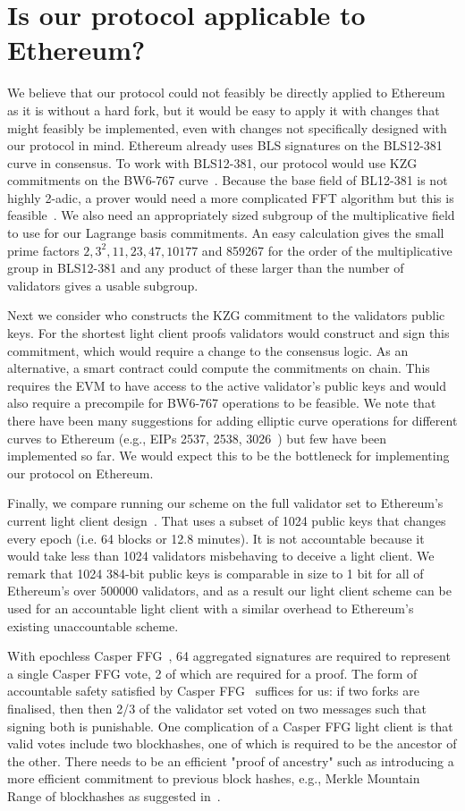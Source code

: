 \section{Is our protocol applicable to Ethereum?}
 \label{sec:ethereum}

We believe that our protocol could not feasibly be directly applied to Ethereum as it is without a hard fork, but it would be easy to apply it with changes that might feasibly be implemented, 
even with changes not specifically designed with our protocol in mind. Ethereum already uses BLS signatures on the BLS12-381 curve in consensus. To work with BLS12-381, 
our protocol would use KZG commitments on the BW6-767 curve~\cite{bw6767}. Because the base field of BL12-381 is not highly 2-adic, a prover would need a more complicated FFT algorithm 
but this is feasible~\cite{bw6767}. We also need an appropriately sized subgroup of the multiplicative field to use for our Lagrange basis commitments. An easy calculation gives the small prime factors $2,3^2,11,23,47,10177$ and 859267 for the order of the multiplicative group in BLS12-381 and any product of these larger than the number of validators gives a usable subgroup.
 
 Next we consider who constructs the KZG commitment to the validators public keys. For the shortest light client proofs validators would construct and sign this commitment, which would require a change to the consensus logic. As an alternative, a smart contract could compute the commitments on chain.
 This requires the EVM to have access to the active validator's public keys and would also require a precompile for BW6-767 operations to be feasible.
 We note that there have been many suggestions for adding elliptic curve operations for different curves to Ethereum (e.g., EIPs 2537, 2538, 3026~\cite{EIPs}) but few have been implemented so far.
 We would expect this to be the bottleneck for implementing our protocol on Ethereum.
 
 Finally, we compare running our scheme on the full validator set to Ethereum's current light client design~\cite{ethlight}.
 That uses a subset of 1024 public keys that changes every epoch (i.e. 64 blocks or 12.8 minutes). It is not accountable because it would take less than 1024 validators misbehaving to deceive a light client. We remark that 1024 384-bit public keys is comparable in size to 1 bit for all of Ethereum's over 500000 validators, and as a result our light client scheme can be used for an accountable light client with a similar overhead to Ethereum's existing unaccountable scheme.

 With epochless Casper FFG~\cite{Gasper}, 64 aggregated signatures are required to represent a single Casper FFG vote, 2 of which are required for a proof. The form of accountable safety satisfied by Casper FFG~\cite{CasperFFG} suffices for us: if two forks are finalised, then then 2/3 of the validator set voted on two messages such that signing both is punishable.  One complication of a Casper FFG light client is that valid votes include two blockhashes, one of which is required to be the ancestor of the other. There needs to be an efficient "proof of ancestry" such as introducing a more efficient commitment to previous block hashes, e.g., Merkle Mountain Range of blockhashes as suggested in~\cite{flyclient}.
